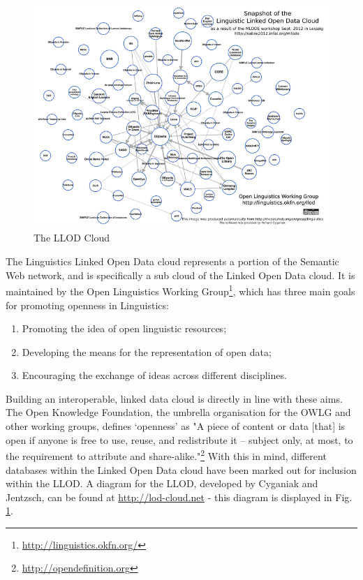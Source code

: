 \begin{figure}[t!hpb]
\caption{The LLOD Cloud}\label{f1}
\includegraphics[width=15cm,keepaspectratio]{llod.png}
\end{figure}

The Linguistics Linked Open Data cloud represents a portion of the Semantic Web network, and is specifically a sub cloud of the Linked Open Data cloud. It is maintained by the Open Linguistics Working Group\footnote{\url{http://linguistics.okfn.org/}}, which has three main goals for promoting openness in Linguistics: \begin{enumerate} \item Promoting the idea of open linguistic resources; \item Developing the means for the representation of open data; \item Encouraging the exchange of ideas across different disciplines. \end{enumerate}

Building an interoperable, linked data cloud is directly in line with these aims. The Open Knowledge Foundation, the umbrella organisation for the OWLG and other working groups, defines `openness' as "A piece of content or data [that] is open if anyone is free to use, reuse, and redistribute it -- subject only, at most, to the requirement to attribute and share-alike."\footnote{\url{http://opendefinition.org}} With this in mind, different databases within the Linked Open Data cloud have been marked out for inclusion within the LLOD. A diagram for the LLOD, developed by Cyganiak and Jentzsch, can be found at \url{http://lod-cloud.net} - this diagram is displayed in Fig. \ref{f1}. 

